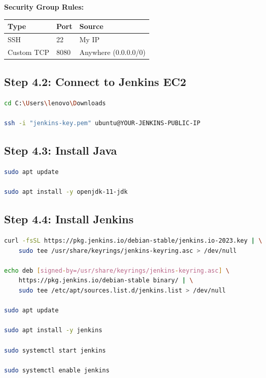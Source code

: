 \documentclass[12pt,a4paper]{article}
\begin{document}
\textbf{Security Group Rules:}

\begin{center}
\begin{tabular}{|l|l|l|}
\hline
\textbf{Type} & \textbf{Port} & \textbf{Source} \\
\hline
SSH & 22 & My IP \\
Custom TCP & 8080 & Anywhere (0.0.0.0/0) \\
\hline
\end{tabular}
\end{center}

\subsection{Step 4.2: Connect to Jenkins EC2}

\begin{lstlisting}[language=bash]
cd C:\Users\lenovo\Downloads

ssh -i "jenkins-key.pem" ubuntu@YOUR-JENKINS-PUBLIC-IP
\end{lstlisting}

\subsection{Step 4.3: Install Java}

\begin{lstlisting}[language=bash]
sudo apt update

sudo apt install -y openjdk-11-jdk
\end{lstlisting}

\subsection{Step 4.4: Install Jenkins}

\begin{lstlisting}[language=bash]
curl -fsSL https://pkg.jenkins.io/debian-stable/jenkins.io-2023.key | \
    sudo tee /usr/share/keyrings/jenkins-keyring.asc > /dev/null

echo deb [signed-by=/usr/share/keyrings/jenkins-keyring.asc] \
    https://pkg.jenkins.io/debian-stable binary/ | \
    sudo tee /etc/apt/sources.list.d/jenkins.list > /dev/null

sudo apt update

sudo apt install -y jenkins

sudo systemctl start jenkins

sudo systemctl enable jenkins
\end{lstlisting}
\end{document}
